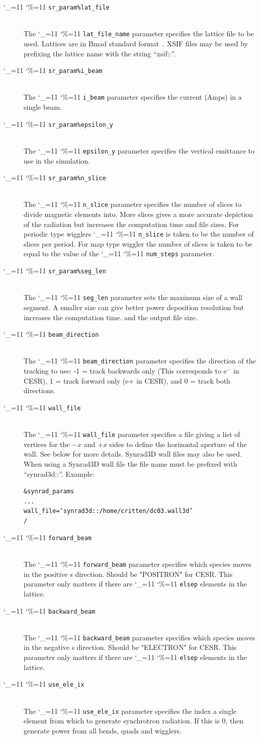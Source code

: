 \documentclass[11pt]{article}
\newcommand\ttcmd{\begingroup\catcode`\_=11 \catcode`\%=11 \dottcmd}
\newcommand\dottcmd[1]{\texttt{#1}\endgroup}
\newcommand{\vn}{\ttcmd}
\newcommand{\Newline}{\hfil \\}
\newenvironment{example}
  {\vspace{-3.0ex} \begin{alltt}}
  {\end{alltt} \vspace{-2.5ex}}
\begin{document}
  \begin{description}
  \item[\vn{sr_param\%lat_file}] \Newline
The \vn{lat_file_name} parameter specifies the lattice file to be
used.  Lattices are in Bmad standard format~\cite{b:bmad}. XSIF files may
be used by prefixing the lattice name with the string ``xsif::''.
  \item[\vn{sr_param\%i_beam}] \Newline
The \vn{i_beam} parameter specifies the current (Amps) in a single beam.
  \item[\vn{sr_param\%epsilon_y}] \Newline
The \vn{epsilon_y} parameter specifies the vertical emittance to use 
in the simulation.
  \item[\vn{sr_param\%n_slice}] \Newline
The \vn{n_slice} parameter specifies the number of slices to divide
magnetic elements into.  More slices gives a more accurate depiction 
of the radiation but increases the computation time and file sizes. 
For periodic type wigglers \vn{n_slice} is taken to be the
number of slices per period. For map type wiggler the number of slices is
taken to be equal to the value of the \vn{num_steps} parameter.
  \item[\vn{sr_param\%seg_len}] \Newline
The \vn{seg_len} parameter sets the maximum size of a wall segment. 
A smaller size can give better power deposition resolution but 
increases the computation time. and the output file size.
  \item[\vn{beam_direction}] \Newline
The \vn{beam_direction} parameter specifies the direction of the
tracking to use: -1 = track backwards only (This corresponds to e$^-$
in CESR), 1 = track forward only (e+ in CESR), and 0 = track both
directions.
  \item[\vn{wall_file}] \Newline
The \vn{wall_file} parameter specifies a file giving a list of 
vertices for the $-x$ and $+x$ sides to define the horizontal aperture of
the wall. See below for more details. Synrad3D wall files may also be
used. When using a Synrad3D wall file the file name must be prefixed
with ``synrad3d::''. Example:
\begin{example}
  &synrad_params
    ...
    wall_file = 'synrad3d::/home/critten/dc03.wall3d'
  /
\end{example}
  \item[\vn{forward_beam}] \Newline
The \vn{forward_beam} parameter specifies which species moves in the
positive s direction.  Should be "POSITRON" for CESR. This parameter
only matters if there are \vn{elsep} elements in the lattice.
  \item[\vn{backward_beam}] \Newline
The \vn{backward_beam} parameter specifies which species moves in the
negative s direction.  Should be "ELECTRON" for CESR. This parameter
only matters if there are \vn{elsep} elements in the lattice.
  \item[\vn{use_ele_ix}] \Newline
The \vn{use_ele_ix} parameter specifies the index a single element 
from which to generate synchrotron radiation.  If this is 0, then
generate power from all bends, quads and wigglers.
  \end{description}
\end{document}
